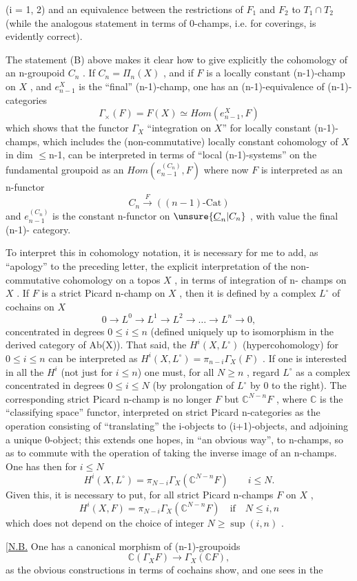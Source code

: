 
(i = 1, 2) and an equivalence between the restrictions of $F_1$ and $F_2$
to $T_1 \cap T_2$ (while the analogous statement in terms of 0-champs, i.e. for
coverings, is evidently correct).

The statement (B) above makes it clear how to give explicitly the
cohomology of an n-groupoid $C_n$ . If $C_n = \Pi_n(X)$ , and if $F$ is a locally
constant (n-1)-champ on $X$ , and $e^{X}_{n-1}$ is the ``final'' (n-1)-champ, one has
an (n-1)-equivalence of (n-1)-categories
\[ \Gamma_{\times}(F) = F(X) \simeq \mathit{Hom}(e^{X}_{n-1}, F) \]
which shows that the functor $\Gamma_X$ ``integration on $X$'' for locally constant
(n-1)-champs, which includes the (non-commutative) locally constant cohomology
of $X$ in dim $\leq$n-1, can be interpreted in terms of ``local (n-1)-systems''
on the fundamental groupoid as an
$\mathit{Hom}(e^{(C_n)}_{n-1} , F)$ where now $F$ is interpreted as an n-functor
\[ C_n \xrightarrow{\ F\ } ((n-1)\text{-Cat}) \]
and $e^{(C_n)}_{n-1}$ is the constant n-functor on $\unsure{\underline{C}_n|C_n}$ , with value the final (n-1)-
category.

To interpret this in cohomology notation, it is necessary for me to add,
as ``apology'' to the preceding letter, the explicit interpretation of the
non-commutative cohomology on a topos $X$ , in terms of integration of n-
champs on $X$ . If $F$ is a strict Picard n-champ on $X$ , then it is defined
by a complex $L^{\circ}$ of cochains on $X$
\[ 0 \to L^0 \to L^1 \to L^2 \to \ldots \to L^n \to 0 , \]
concentrated in degrees $0 \leq i \leq n$ (defined uniquely up to isomorphism in
the derived category of Ab(X)). That said, the $H^i(X, L^{\circ})$ (hypercohomology)
for $0 \leq i \leq n$ can be interpreted as $H^i(X, L^{\circ}) = \pi_{n-i}\Gamma_X(F)$ . If one is
interested in all the $H^i$ (not just for $i \leq n$) one must, for all $N \geq n$ ,
regard $L^{\circ}$ as a complex concentrated in degrees $0 \leq i \leq N$ (by prolongation
of $L^{\circ}$ by 0 to the right). The corresponding strict Picard n-champ is no
longer $F$ but $\mathbb{C}^{N-n}F$ , where $\mathbb{C}$ is the ``classifying space'' functor, interpreted
on strict Picard n-categories as the operation consisting of ``translating''
the i-objects to (i+1)-objects, and adjoining a unique 0-object; this extends
one hopes, in ``an obvious way'', to n-champs, so as to commute with the operation
of taking the inverse image of an n-champs. One has then for $i \leq N$
\[ H^i(X, L^{\circ}) = \pi_{N-i}\Gamma_X(\mathbb{C}^{N-n}F) \qquad i \leq N . \]
Given this, it is necessary to put, for all strict Picard n-champs $F$ on $X$ ,
\[ H^i(X, F) = \pi_{N-i}\Gamma_X(\mathbb{C}^{N-n}F) \quad \text{if} \quad N \leq i, n \]
which does not depend on the choice of integer $N \geq \sup(i, n)$ .

[\uline{N.B.} One has a canonical morphism of (n-1)-groupoids
\[ \mathbb{C}(\Gamma_X F) \longrightarrow \Gamma_X(\mathbb{C}F) , \]
as the obvious constructions in terms of cochains show, and one sees in the

